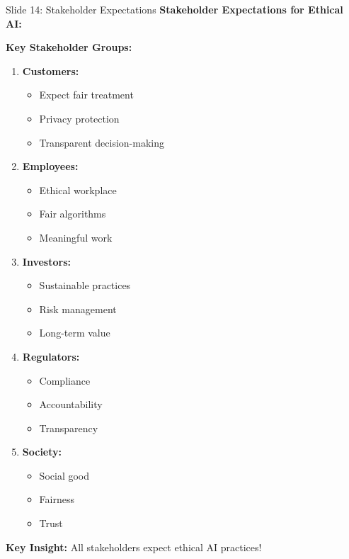 \documentclass[8pt]{beamer}
\begin{document}
	\begin{frame}{Slide 14: Stakeholder Expectations}
		\fontsize{6.5}{7.5}\selectfont
		\textbf{Stakeholder Expectations for Ethical AI:}
		
		\vspace{0.1cm}
		\textbf{Key Stakeholder Groups:}
		\begin{enumerate}
			\item \textbf{Customers:}
			\begin{itemize}
				\item Expect fair treatment
				\item Privacy protection
				\item Transparent decision-making
			\end{itemize}
			\item \textbf{Employees:}
			\begin{itemize}
				\item Ethical workplace
				\item Fair algorithms
				\item Meaningful work
			\end{itemize}
			\item \textbf{Investors:}
			\begin{itemize}
				\item Sustainable practices
				\item Risk management
				\item Long-term value
			\end{itemize}
			\item \textbf{Regulators:}
			\begin{itemize}
				\item Compliance
				\item Accountability
				\item Transparency
			\end{itemize}
			\item \textbf{Society:}
			\begin{itemize}
				\item Social good
				\item Fairness
				\item Trust
			\end{itemize}
		\end{enumerate}
		
		\textcolor{myblue}{\textbf{Key Insight:}} All stakeholders expect \textcolor{myblue}{ethical AI practices}!
	\end{frame}
	
\end{document}
